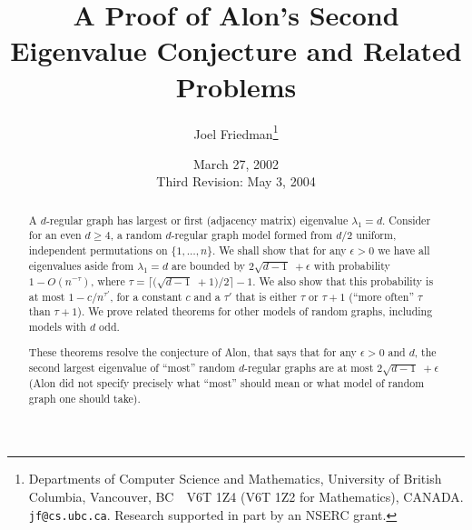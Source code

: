 \documentclass[12pt]{article}
\title{A Proof of Alon's Second Eigenvalue Conjecture and Related Problems}
\author{Joel Friedman\thanks{
        Departments of Computer Science and Mathematics,
        University of British Columbia, Vancouver, BC\ \ V6T 1Z4
        (V6T 1Z2 for Mathematics), CANADA.
        {\tt jf@cs.ubc.ca}.
        Research supported in part by an NSERC grant.}}
\date{March 27, 2002 \\ Third Revision: May 3, 2004}
\newcommand{\intn}{{\{1,\ldots,n\}}}
\begin{document}
\maketitle                 %
\begin{abstract}
A $d$-regular graph has largest or first (adjacency
matrix) eigenvalue $\lambda_1=d$.
Consider for an even $d\ge 4$, a random $d$-regular
graph model
formed from $d/2$ uniform, independent permutations
on $\intn$.  We shall show that for any $\epsilon>0$ we have
all eigenvalues aside from $\lambda_1=d$ are bounded by
$2\sqrt{d-1}\;+\epsilon$ with probability $1-O(n^{-\tau})$,
where $\tau=\lceil \bigl(\sqrt{d-1}\;+1\bigr)/2 \rceil-1$.
We also show that this probability is at most $1-c/n^{\tau'}$,
for a constant $c$ and a $\tau'$ that is either $\tau$ or
$\tau+1$ (``more often'' $\tau$ than $\tau+1$).  We prove
related theorems for other models of random graphs, including
models with $d$ odd.

These theorems resolve the conjecture of Alon, that says that
for any $\epsilon>0$ and $d$,
the second largest eigenvalue of ``most'' random $d$-regular graphs
are at most $2\sqrt{d-1}\;+\epsilon$ (Alon did not specify precisely
what ``most'' should mean or what model of random graph one should
take).



\end{abstract}

\end{document}
